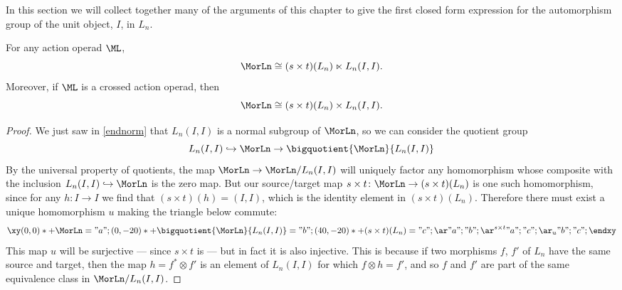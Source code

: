 In this section we will collect together many of the arguments of this chapter to give the first closed form expression for the automorphism group of the unit object, $I$, in $L_n$.
\begin{prop}\label{morprod} For any action operad $\ML$,
  \[
    \MorLn \cong (s \times t)(L_n) \ltimes L_n(I,I).
  \]
Moreover, if $\ML$ is a crossed action operad, then
  \[
    \MorLn \cong (s \times t)(L_n) \times L_n(I,I).
  \]
\end{prop}
\begin{proof}
We just saw in \cref{endnorm} that $L_n(I,I)$ is a normal subgroup of $\MorLn$, so we can consider the quotient group
\[
  L_n(I,I) \hookrightarrow \MorLn \rightarrow \bigquotient{\MorLn}{L_n(I,I)}
\]
By the universal property of quotients, the map $\MorLn \rightarrow \MorLn / L_n(I,I)$ will uniquely factor any homomorphism whose composite with the inclusion $L_n(I,I) \hookrightarrow \MorLn$ is the zero map. But our source/target map $s \times t \colon \MorLn \rightarrow (s \times t)(L_n)$ is one such homomorphism, since for any $h \colon  I \rightarrow I$ we find that $(s \times t)(h) = (I, I)$, which is the identity element in $(s \times t)(L_n)$. Therefore there must exist a unique homomorphism $u$ making the triangle below commute:
  \[
    \xy
      (0,0)*+{\MorLn}="a";
      (0,-20)*+{\bigquotient{\MorLn}{L_n(I,I)}}="b";
      (40,-20)*+{(s \times t)(L_n)}="c";
      {\ar "a" ; "b"};
      {\ar^{s \times t} "a" ; "c"};
      {\ar_{u} "b" ; "c"};
    \endxy
  \]
This map $u$ will be surjective --- since $s \times t$ is --- but in fact it is also injective. This is because if two morphisms $f$, $f'$ of $L_n$ have the same source and target, then the map $h = f^* \otimes f'$ is an element of $L_n(I,I)$ for which $f \otimes h = f'$, and so $f$ and $f'$ are part of the same equivalence class in $\MorLn/L_n(I,I)$. 


\end{proof}
